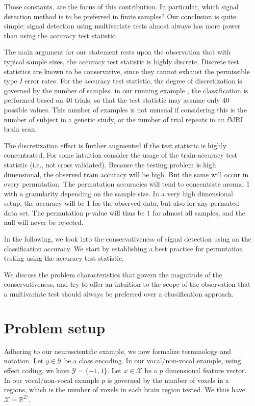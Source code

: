 \documentclass{pnastwo}
\newcommand{\set}[1]{\{ #1 \}} %
\newcommand{\reals}{\mathbb{R}} %
\newcommand{\features}{x} %
\newcommand{\outcomes}{y} %
\newcommand{\featureS}{\mathcal{X}} %
\newcommand{\outcomeS}{\mathcal{Y}} %
\begin{document}
\begin{article}
Those constants, are the focus of this contribution. In particular, which signal detection method is to be preferred in finite samples? 
Our conclusion is quite simple: signal detection using multivariate tests almost always has more power than using the accuracy test statistic.

The main argument for our statement rests upon the observation that with typical sample sizes, the accuracy test statistic is highly discrete. 
Discrete test statistics are known to be conservative, since they cannot exhaust the permissible type $I$ error rates. 
For the accuracy test statistic, the degree of discretization is governed by the number of samples. 
in our running example \cite{gilron_quantifying_2016}, the classification is performed based on $40$ trials, so that the test statistic may assume only $40$ possible values. 
This number of examples is not unusual if considering this is the number of subject in a genetic study, or the number of trial repeats in an fMRI brain scan. 

The discretization effect is further augmented if the test statistic is highly concentrated. 
For some intuition consider the usage of the train-accuracy test statistic (i.e., not cross validated).
Because the testing problem is high dimensional, the observed train accuracy will be high. But the same will occur in every permutation. 
The permutation accuracies will tend to concentrate around $1$ with a granularity depending on the sample size. 
In a very high dimensional setup, the accuracy will be $1$ for the observed data, but also for any permuted data set. 
The permutation p-value will thus be $1$ for almost all samples, and the null will never be rejected. 

In the following, we look into the conservativeness of signal detection using an the classification accuracy. 
We start by establishing a best practice for permutation testing using the accuracy test statistic, 

We discuss the problem characteristics that govern the magnitude of the conservativeness, and try to offer an intuition to the scope of the observation that a multivariate test should always be preferred over a classification approach. 


\section{Problem setup}
\label{sec:problem_setup}

Adhering to our neuroscientific example, we now formalize terminology and notation. 
Let $\outcomes \in \outcomeS$ be a class encoding. In our vocal/non-vocal example, using effect coding, we have $\outcomeS=\set{-1,1}$.
Let $\features \in \featureS$ be a $p$ dimensional feature vector. 
In our vocal/non-vocal example $p$ is governed by the number of voxels in a regions, which is the number of voxels in each brain region tested. We thus have $\featureS=\reals^{27}$. 


\end{article}
\end{document}
